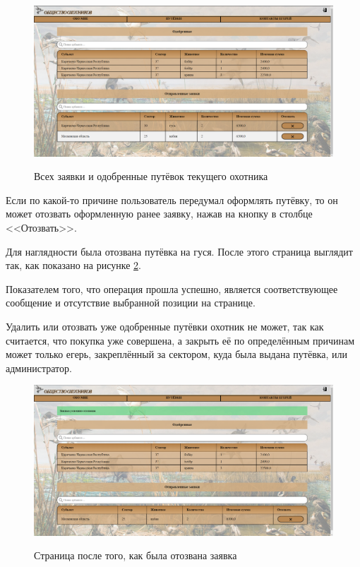 	\begin{figure}[h]
		\centering
		\begin{center}
			{\includegraphics[scale=0.34]{schemes/screens/all_vouchers.png}}
			\caption{Всех заявки и одобренные путёвок текущего охотника}
			\label{fig18:image}
		\end{center}
	\end{figure}

	Если по какой-то причине пользователь передумал оформлять путёвку, то он может отозвать оформленную ранее заявку, нажав на кнопку в столбце <<Отозвать>>. 
	
	Для наглядности была отозвана путёвка на гуся. После этого страница выглядит так, как показано на рисунке \ref{fig19:image}. 
	
	Показателем того, что операция прошла успешно, является соответствующее сообщение и отсутствие выбранной позиции на странице. 
	
	Удалить или отозвать уже одобренные путёвки охотник не может, так как считается, что покупка уже совершена, а закрыть её по определённым причинам может только егерь, закреплённый за сектором, куда была выдана путёвка, или администратор.
	
	\begin{figure}[pt!]
		\centering
		\begin{center}
			{\includegraphics[scale=0.34]{schemes/screens/after_del_huntsman.png}}
			\caption{Страница после того, как была отозвана заявка}
			\label{fig19:image}
		\end{center}
	\end{figure}
	\newpage

